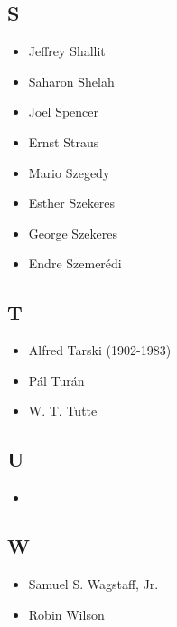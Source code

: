 \documentclass[12pt]{article}
\begin{document}
\subsection{S}
\begin{itemize}
\item Jeffrey Shallit
\item Saharon Shelah
\item Joel Spencer
\item Ernst Straus
\item Mario Szegedy
\item Esther Szekeres
\item George Szekeres
\item Endre Szemer\'edi
\end{itemize}

\subsection{T}
\begin{itemize}
\item Alfred Tarski (1902-1983)
\item P\'al Tur\'an
\item W. T. Tutte
\end{itemize}

\subsection{U}
\begin{itemize}
\item {}
\end{itemize}

\subsection{W}
\begin{itemize}
\item Samuel S. Wagstaff, Jr.
\item Robin Wilson
\end{itemize}
\end{document}

